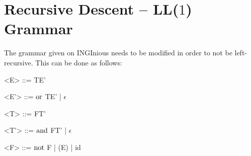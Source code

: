 \section{Recursive Descent -- LL(\(1\)) Grammar}
The grammar given on INGInious needs to be modified in order to not be left-recursive.
This can be done as follows:
\begin{grammar}
	<E> ::= TE'
	
	<E'> ::= \(\mathbin{\mathrm{or}}\) TE' | \(\epsilon\)
	
	<T> ::= FT'
	
	<T'> ::= \(\mathbin{\mathrm{and}}\) FT' | \(\epsilon\)
	
	<F> ::= \(\mathop{\mathrm{not}}\) F | (E) | id
\end{grammar}